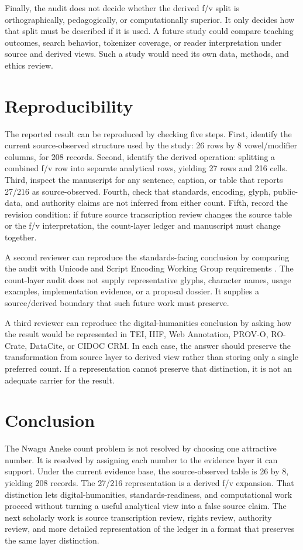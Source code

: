 \documentclass[sigconf,nonacm]{acmart}
\begin{document}
Finally, the audit does not decide whether the derived f/v split is
orthographically, pedagogically, or computationally superior. It only decides
how that split must be described if it is used. A future study could compare
teaching outcomes, search behavior, tokenizer coverage, or reader
interpretation under source and derived views. Such a study would need its own
data, methods, and ethics review.

\section{Reproducibility}
The reported result can be reproduced by checking five steps. First, identify
the current source-observed structure used by the study: 26 rows by
8 vowel/modifier columns, for 208 records. Second, identify the derived
operation: splitting a combined f/v row into separate analytical rows, yielding
27 rows and 216 cells. Third, inspect the manuscript for any sentence, caption,
or table that reports 27/216 as source-observed. Fourth, check that standards,
encoding, glyph, public-data, and authority claims are not inferred from either
count. Fifth, record the revision condition: if future source transcription
review changes the source table or the f/v interpretation, the count-layer
ledger and manuscript must change together.

A second reviewer can reproduce the standards-facing conclusion by comparing
the audit with Unicode and Script Encoding Working Group requirements
\cite{unicode17CoreSpec,unicodeProposals,unicodeRoadmaps,unicodePipeline2026,seiProposalTips}.
The count-layer audit does not supply representative glyphs, character names,
usage examples, implementation evidence, or a proposal dossier. It supplies a
source/derived boundary that such future work must preserve.

A third reviewer can reproduce the digital-humanities conclusion by asking how
the result would be represented in TEI, IIIF, Web Annotation, PROV-O, RO-Crate,
DataCite, or CIDOC CRM. In each case, the answer should preserve the
transformation from source layer to derived view rather than storing only a
single preferred count. If a representation cannot preserve that distinction,
it is not an adequate carrier for the result.

\section{Conclusion}
The Nwagu Aneke count problem is not resolved by choosing one attractive number.
It is resolved by assigning each number to the evidence layer it can support.
Under the current evidence base, the source-observed table is 26 by 8, yielding
208 records. The 27/216 representation is a derived f/v expansion. That
distinction lets digital-humanities, standards-readiness, and computational
work proceed without turning a useful analytical view into a false source
claim. The next scholarly work is source transcription review, rights review,
authority review, and more detailed representation of the ledger in a format
that preserves the same layer distinction.



\end{document}
